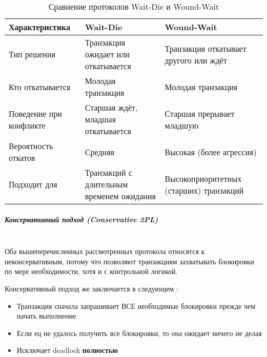  \begin{table}[H]
     \centering
     \caption{Сравнение протоколов Wait-Die и Wound-Wait}
     \begin{tabular}{|l|p{5.25cm}|p{5.25cm}|}
         \hline
         \textbf{Характеристика} & \textbf{Wait-Die} & \textbf{Wound-Wait} \\
         \hline
         Тип решения & Транзакция ожидает или откатывается & Транзакция откатывает другого или ждёт \\
         \hline
         Кто откатывается & Молодая транзакция & Молодая транзакция \\
         \hline
         Поведение при конфликте & Старшая ждёт, младшая откатывается & Старшая прерывает младшую \\
         \hline
         Вероятность откатов & Средняя & Высокая (более агрессия) \\
         \hline
         Подходит для & Транзакций с длительным временем ожидания & Высокоприоритетных (старших) транзакций \\
         \hline
     \end{tabular}
 \end{table}
 
 \subparagraph{Консервативный подход (Conservative 2PL)} ~\\

 Оба вышеперечисленных рассмотренных протокола относятся к неконсервативным, потому что позволяют транзакциям захватывать блокировки по мере необходимости, хотя и с контрольной логикой.
 
 Консервативный подход же заключается в следующем \autocite{Silberschatz, ElmasriNavathe}:
 \begin{itemize}
     \item Транзакция сначала запрашивает ВСЕ необходимые блокировки прежде чем начать выполнение
     \item Если ец не удалось получить все блокировки, то она ожидает ничего не делая
     \item Исключает deadlock \textbf{полностью}
 \end{itemize}
 
